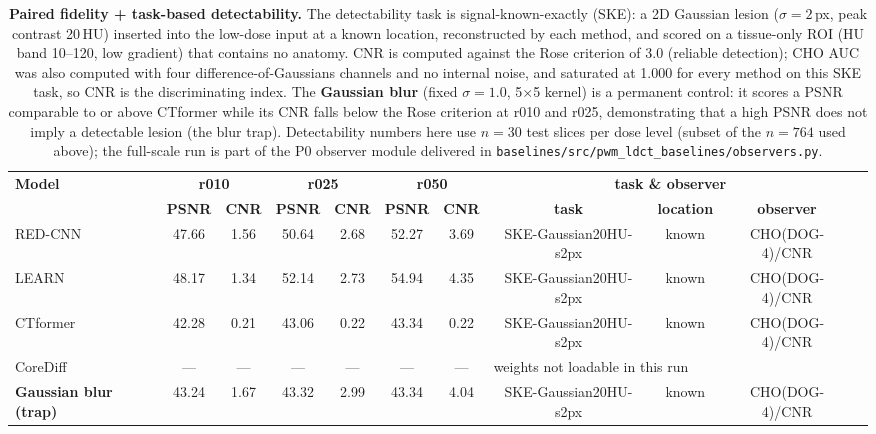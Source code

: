 \documentclass[twoside,11pt]{article}
\begin{document}
\begin{table}[ht]
    \centering
    \small
    \setlength{\tabcolsep}{4pt}
    \begin{tabular}{lcccccccccc}
        \toprule
        \multirow{2}{*}{\textbf{Model}} & \multicolumn{2}{c}{\textbf{r010}} & \multicolumn{2}{c}{\textbf{r025}} & \multicolumn{2}{c}{\textbf{r050}} & \multicolumn{3}{c}{\textbf{task \& observer}} \\
        \cmidrule(lr){2-3} \cmidrule(lr){4-5} \cmidrule(lr){6-7} \cmidrule(lr){8-10}
        & \textbf{PSNR} & \textbf{CNR} & \textbf{PSNR} & \textbf{CNR} & \textbf{PSNR} & \textbf{CNR} & \textbf{task} & \textbf{location} & \textbf{observer} \\
        \midrule
        RED-CNN   & 47.66 & 1.56 & 50.64 & 2.68 & 52.27 & 3.69 & SKE-Gaussian20HU-s2px & known & CHO(DOG-4)/CNR \\
        LEARN     & 48.17 & 1.34 & 52.14 & 2.73 & 54.94 & 4.35 & SKE-Gaussian20HU-s2px & known & CHO(DOG-4)/CNR \\
        CTformer  & 42.28 & 0.21 & 43.06 & 0.22 & 43.34 & 0.22 & SKE-Gaussian20HU-s2px & known & CHO(DOG-4)/CNR \\
        CoreDiff  & ---   & ---  & ---   & ---  & ---   & ---  & \multicolumn{3}{l}{\footnotesize weights not loadable in this run} \\
        \textbf{Gaussian blur (trap)} & 43.24 & 1.67 & 43.32 & 2.99 & 43.34 & 4.04 & SKE-Gaussian20HU-s2px & known & CHO(DOG-4)/CNR \\
        \bottomrule
    \end{tabular}
    \caption{\textbf{Paired fidelity + task-based detectability.} The detectability task is signal-known-exactly (SKE): a 2D Gaussian lesion ($\sigma = 2$\,px, peak contrast 20\,HU) inserted into the low-dose input at a known location, reconstructed by each method, and scored on a tissue-only ROI (HU band 10--120, low gradient) that contains no anatomy. CNR is computed against the Rose criterion of 3.0 (reliable detection); CHO AUC was also computed with four difference-of-Gaussians channels and no internal noise, and saturated at 1.000 for every method on this SKE task, so CNR is the discriminating index. The \textbf{Gaussian blur} (fixed $\sigma = 1.0$, 5$\times$5 kernel) is a permanent control: it scores a PSNR comparable to or above CTformer while its CNR falls below the Rose criterion at r010 and r025, demonstrating that a high PSNR does not imply a detectable lesion (the blur trap). Detectability numbers here use $n = 30$ test slices per dose level (subset of the $n = 764$ used above); the full-scale run is part of the P0 observer module delivered in \texttt{baselines/src/pwm\_ldct\_baselines/observers.py}.}
    \label{tab:detectability_v05}
\end{table}
\end{document}
